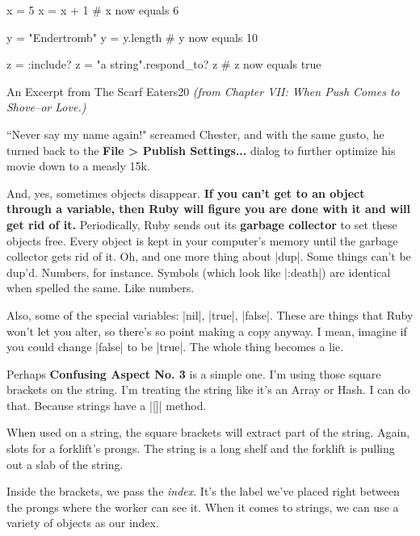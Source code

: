 \documentclass[12pt,twoside]{report}
\begin{document}
\begin{rubycode}

 x = 5
 x = x + 1
 # x now equals 6

 y = "Endertromb"
 y = y.length
 # y now equals 10

 z = :include?
 z = "a string".respond_to? z
 # z now equals true

\end{rubycode}

	\begin{sidebar}{An Excerpt from The Scarf Eaters}{20}
		\vspace{6pt}
		\textit{(from Chapter VII: When Push Comes to Shove--or Love.)}\vspace{6pt}
		
		``Never say my name again!" screamed Chester, and with the same gusto, he turned back to the \textbf{File > Publish Settings...} dialog to further optimize his movie down to a measly 15k.\vspace{6pt}
	\end{sidebar}

And, yes, sometimes objects disappear.  {\bf If you can't get to an
  object through a variable, then Ruby will figure you are done with
  it and will get rid of it.}  Periodically, Ruby sends out its {\bf
  garbage collector} to set these objects free.  Every object is kept
in your computer's memory until the garbage collector gets rid of it.
Oh, and one more thing about \rubyinline|dup|.  Some
things can't be dup'd.  Numbers, for instance.  Symbols (which look
like \rubyinline|:death|) are identical when spelled
the same.  Like numbers.

Also, some of the special variables: \rubyinline|nil|,
\rubyinline|true|, \rubyinline|false|.
These are things that Ruby won't let you alter, so there's so point
making a copy anyway.  I mean, imagine if you could change
\rubyinline|false| to be
\rubyinline|true|.  The whole thing becomes a lie.

Perhaps {\bf Confusing Aspect No. 3} is a simple one.  I'm using those
square brackets on the string.  I'm treating the string like it's an
Array or Hash.  I can do that.  Because strings have a
\rubyinline|[]| method.

When used on a string, the square brackets will extract part of the
string.  Again, slots for a forklift's prongs.  The string is a long
shelf and the forklift is pulling out a slab of the string.

Inside the brackets, we pass the {\em index}.  It's the label we've
placed right between the prongs where the worker can see it.  When it
comes to strings, we can use a variety of objects as our index.
\end{document}
